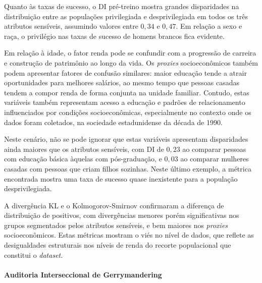 Quanto às taxas de sucesso, o DI pré-treino mostra grandes disparidades na distribuição entre as populações privilegiada e desprivilegiada em todos os três atributos sensíveis, assumindo valores entre $0,34$ e $0,47$. Em relação a sexo e raça, o privilégio nas taxas de sucesso de homens brancos fica evidente.

Em relação à idade, o fator renda pode se confundir com a progressão de carreira e construção de patrimônio ao longo da vida. Os \textit{proxies} socioeconômicos também podem apresentar fatores de confusão similares: maior educação tende a atrair oportunidades para melhores salários, ao mesmo tempo que pessoas casadas tendem a compor renda de forma conjunta na unidade familiar. Contudo, estas variáveis também representam acesso a educação e padrões de relacionamento influenciados por condições socioeconômicas, especialmente no contexto onde os dados foram coletados, na sociedade estadunidense da década de 1990.

Neste cenário, não se pode ignorar que estas variáveis apresentam disparidades ainda maiores que os atributos sensíveis, com DI de $0,23$ ao comparar pessoas com educação básica àquelas com pós-graduação, e $0,03$ ao comparar mulheres casadas com pessoas que criam filhos sozinhas. Neste último exemplo, a métrica encontrada mostra uma taxa de sucesso quase inexistente para a população desprivilegiada.

A divergência KL e o Kolmogorov-Smirnov confirmaram a diferença de distribuição de positivos, com divergências menores porém significativas nos grupos segmentados pelos atributos sensíveis, e bem maiores nos \textit{proxies} socioeconômicos. Estas métricas mostram o viés no nível de dados, que reflete as desigualdades estruturais nos níveis de renda do recorte populacional que constitui o \textit{dataset}.

\paragraph{Auditoria Interseccional de Gerrymandering}

